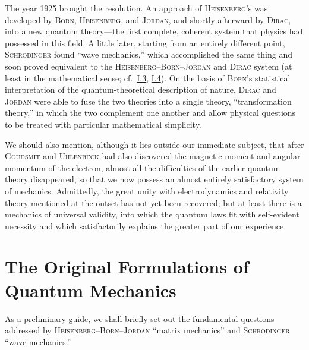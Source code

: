 \documentclass[fontsize=13pt,twoside,openany,headings=normal,parskip=false,bookmarkpackage=false,DIV=calc]{scrbook}
\begin{document}
The year 1925 brought the resolution. An approach of \textsc{Heisenberg}'s was developed by \textsc{Born}, \textsc{Heisenberg}, and \textsc{Jordan}, and shortly afterward by \textsc{Dirac}, into a new quantum theory---the first complete, coherent system that physics had possessed in this field.
\hypertarget{origpage-5}{}%
A little later, starting from an entirely different point, \textsc{Schrödinger} found ``wave mechanics,'' which accomplished the same thing and soon proved equivalent to the \textsc{Heisenberg--\allowbreak Born--\allowbreak Jordan} and \textsc{Dirac} system (at least in the mathematical sense; cf.\ \hyperref[sec:I.3]{I.3}, \hyperref[sec:I.4]{I.4}). On the basis of \textsc{Born}'s statistical interpretation of the quantum-theoretical description of nature, \textsc{Dirac} and \textsc{Jordan} were able to fuse the two theories into a single theory, ``transformation theory,'' in which the two complement one another and allow physical questions to be treated with particular mathematical simplicity.

We should also mention, although it lies outside our immediate subject, that after \textsc{Goudsmit} and \textsc{Uhlenbeck} had also discovered the magnetic moment and angular momentum of the electron, almost all the difficulties of the earlier quantum theory disappeared, so that we now possess an almost entirely satisfactory system of mechanics. Admittedly, the great unity with electrodynamics and relativity theory mentioned at the outset has not yet been recovered; but at least there is a mechanics of universal validity, into which the quantum laws fit with self-evident necessity and which satisfactorily explains the greater part of our experience.

\section{The Original Formulations of Quantum Mechanics}\label{sec:I.2}
As a preliminary guide, we shall briefly set out the fundamental questions addressed by \textsc{Heisenberg--\allowbreak Born--\allowbreak Jordan} ``matrix mechanics'' and \textsc{Schrödinger} ``wave mechanics.''
\end{document}
